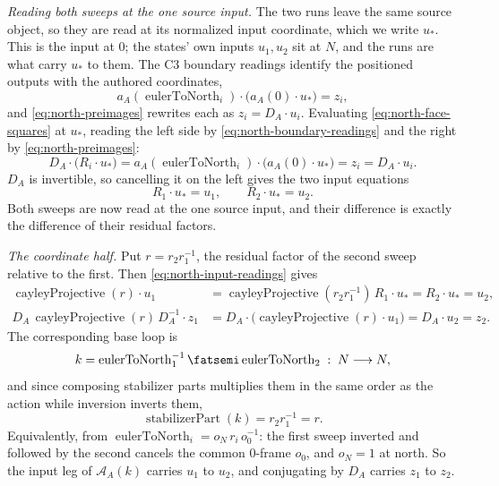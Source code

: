 \medskip
\noindent\emph{Reading both sweeps at the one source input.}
The two runs leave the same source object, so they are read at its normalized
input coordinate, which we write $u_\ast$. This is the input at $0$; the states'
own inputs $u_1,u_2$ sit at $N$, and the runs are what carry $u_\ast$ to them.
The C3 boundary readings identify the positioned outputs with the authored
coordinates,
\[
  a_A(\operatorname{eulerToNorth}_i)\mathbin{\cdot}
    \bigl(a_A(0)\mathbin{\cdot}u_\ast\bigr)=z_i ,
                                    \tag{B}\label{eq:north-boundary-readings}
\]
and \eqref{eq:north-preimages} rewrites each as $z_i=D_A\mathbin{\cdot}u_i$.
Evaluating \eqref{eq:north-face-squares} at $u_\ast$, reading the left side by
\eqref{eq:north-boundary-readings} and the right by
\eqref{eq:north-preimages}:
\[
  D_A\mathbin{\cdot}\bigl(R_i\mathbin{\cdot}u_\ast\bigr)
    =a_A(\operatorname{eulerToNorth}_i)\mathbin{\cdot}
      \bigl(a_A(0)\mathbin{\cdot}u_\ast\bigr)
    =z_i=D_A\mathbin{\cdot}u_i .
\]
$D_A$ is invertible, so cancelling it on the left gives the two input equations
\[
  R_1\mathbin{\cdot}u_\ast=u_1,\qquad
  R_2\mathbin{\cdot}u_\ast=u_2 .
                                    \tag{I}\label{eq:north-input-readings}
\]
Both sweeps are now read at the one source input, and their difference is
exactly the difference of their residual factors.

\medskip
\noindent\emph{The coordinate half.}
Put $r=r_2r_1^{-1}$, the residual factor of the second sweep relative to the
first. Then \eqref{eq:north-input-readings} gives
\[
\begin{aligned}
  \operatorname{cayleyProjective}(r)\mathbin{\cdot}u_1
    &=\operatorname{cayleyProjective}(r_2r_1^{-1})\,R_1\mathbin{\cdot}u_\ast
     =R_2\mathbin{\cdot}u_\ast=u_2,\\[0.6ex]
  D_A\,\operatorname{cayleyProjective}(r)\,D_A^{-1}\mathbin{\cdot}z_1
    &=D_A\mathbin{\cdot}
       \bigl(\operatorname{cayleyProjective}(r)\mathbin{\cdot}u_1\bigr)
     =D_A\mathbin{\cdot}u_2=z_2 .
\end{aligned}
\]
The corresponding base loop is
\[
  k=\operatorname{eulerToNorth}_1^{-1}
    \fatsemi\operatorname{eulerToNorth}_2\;:\;N\longrightarrow N,
\]
and since composing stabilizer parts multiplies them in the same order as the
action while inversion inverts them,
\[
  \operatorname{stabilizerPart}(k)=r_2r_1^{-1}=r .
                                    \tag{R}\label{eq:north-relative-stabilizer}
\]
Equivalently, from $\operatorname{eulerToNorth}_i=o_N\,r_i\,o_0^{-1}$: the first
sweep inverted and followed by the second cancels the common $0$-frame $o_0$,
and $o_N=1$ at north. So the input leg of $\mathcal A_A(k)$ carries $u_1$ to
$u_2$, and conjugating by $D_A$ carries $z_1$ to $z_2$.

